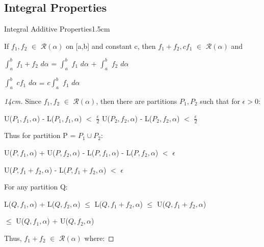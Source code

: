 \subsection{ Integral Properties }

    \begin{ltheorem}{Integral Additive Properties}{1.5cm}
        \item If $f_1,f_2$ $\in$ $\mathscr{R}(\alpha)$ on [a,b] and constant c,
        then $f_1 + f_2,cf_1$ $\in$ $\mathscr{R}(\alpha)$ and

        \hspace{0.5cm}
        $\int_a^b$ $f_1 + f_2$ $d\alpha$
        = $\int_a^b$ $f_1$ $d\alpha$ + $\int_a^b$ $f_2$ $d\alpha$

        \hspace{0.5cm}
        $\int_a^b$ $cf_1$ $d\alpha$ = $c \int_a^b$ $f_1$ $d\alpha$

            \begin{proof}[14cm]
                Since $f_1,f_2$ $\in$ $\mathscr{R}(\alpha)$, then there are
                partitions $P_1,P_2$ such that for $\epsilon > 0$:

                \hspace{0.5cm}
                U($P_1,f_1,\alpha$) - L($P_1,f_1,\alpha$) $<$ $\frac{\epsilon}{2}$
                \hspace{1cm}
                U($P_2,f_2,\alpha$) - L($P_2,f_2,\alpha$) $<$ $\frac{\epsilon}{2}$

                Thus for partition P = $P_1 \cup P_2$:

                \hspace{0.5cm}
                U($P,f_1,\alpha$) + U($P,f_2,\alpha$)
                - L($P,f_1,\alpha$) - L($P,f_2,\alpha$)
                $<$ $\epsilon$

                \hspace{0.5cm}
                U($P,f_1+f_2,\alpha$) - L($P,f_1+f_2,\alpha$) $<$ $\epsilon$

                For any partition Q:

                \hspace{0.5cm}
                L($Q,f_1,\alpha$) + L($Q,f_2,\alpha$)
                $\leq$ L($Q,f_1+f_2,\alpha$)
                $\leq$ U($Q,f_1+f_2,\alpha$)

                \hspace{5cm}
                $\leq$ U($Q,f_1,\alpha$) + U($Q,f_2,\alpha$)

                Thus, $f_1+f_2$ $\in$ $\mathscr{R}(\alpha)$ where:


\end{proof}
\end{ltheorem}
